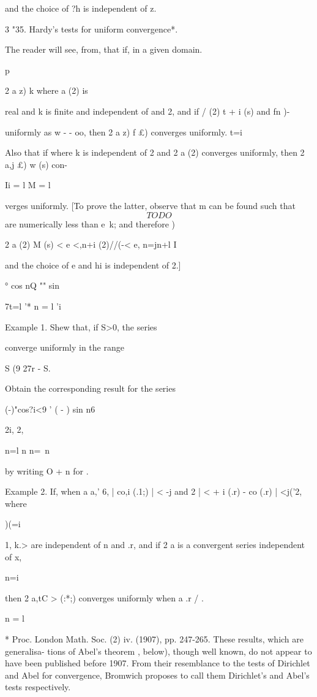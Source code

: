 and the choice of ?h is independent of z.

3 "35. Hardy's tests for uniform convergence*.

The reader will see, from, that if, in a given domain.

p

2 a z) k where a (2) is

real and k is finite and independent of and 2, and if / (2) t + i (s)
and fn )-

uniformly as w - - oo, then 2 a z) f £) converges uniformly. t=i

Also that if where k is independent of 2 and 2 a (2) converges
uniformly, then 2 a,j £) w (s) con-

Ii = l M = l

verges uniformly. [To prove the latter, observe that m can be found
such that
$$
TODO
$$
are numerically less than e\ k; and therefore )

2 a (2) M (s) < e <,n+i (2)//(-< e, n=jn+l I

and the choice of e and hi is independent of 2.]

° cos nQ "" sin %

7t=l '* n = l 'i

Example 1. Shew that, if S>0, the series

converge uniformly in the range

S (9 27r - S.

Obtain the corresponding result for the series

  (-)"cos?i<9 ' ( - ) sin n6

2i, 2,

n=l n n=\ n

by writing O + n for .

Example 2. If, when a a,' 6, | co,i (.1;) | < -j and 2 | < + i (.r) -
co (.r) | <j('2, where

)(=i

 1, k.> are independent of n and .r, and if 2 a is a convergent
series independent of x,

n=i

then 2 a,tC > (:*;) converges uniformly when a .r / . 

n = l

* Proc. London Math. Soc. (2) iv. (1907), pp. 247-265. These results,
which are generalisa- tions of Abel's theorem , below), though
well known, do not appear to have been published before 1907. From
their resemblance to the tests of Dirichlet and Abel for convergence,
Bromwich proposes to call them Dirichlet's and Abel's tests
respectively.

